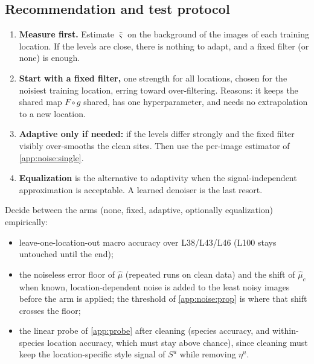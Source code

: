 \subsection{Recommendation and test protocol}
\label{app:noise:rec}
\begin{enumerate}[label=(\arabic*),leftmargin=2.2em]
\item \textbf{Measure first.} Estimate $\hat\varsigma$ on the background of the images of each training
      location. If the levels are close, there is nothing to adapt, and a fixed filter (or none) is
      enough.
\item \textbf{Start with a fixed filter,} one strength for all locations, chosen for the noisiest
      training location, erring toward over-filtering. Reasons: it keeps the shared map $F\circ g$ shared, has one
      hyperparameter, and needs no extrapolation to a new location.
\item \textbf{Adaptive only if needed:} if the levels differ strongly and the fixed filter visibly
      over-smooths the clean sites. Then use the per-image estimator of \cref{app:noise:single}.
\item \textbf{Equalization} is the alternative to adaptivity when the signal-independent
      approximation is acceptable. A learned denoiser is the last resort.
\end{enumerate}
Decide between the arms (none, fixed, adaptive, optionally equalization) empirically:
\begin{itemize}[leftmargin=1.5em]
\item leave-one-location-out macro accuracy over L38/L43/L46 (L100 stays untouched until the end);
\item the noiseless error floor of $\hat\mu$ (repeated runs on clean data) and the shift of $\hat\mu_c$
      when known, location-dependent noise is added to the least noisy images before the arm is applied;
      the threshold of \cref{app:noise:prop} is where that shift crosses the floor;
\item the linear probe of \cref{app:probe} after cleaning (species accuracy, and within-species location
      accuracy, which must stay above chance), since cleaning must keep the location-specific style
      signal of $S^u$ while removing $\eta^u$.
\end{itemize}

